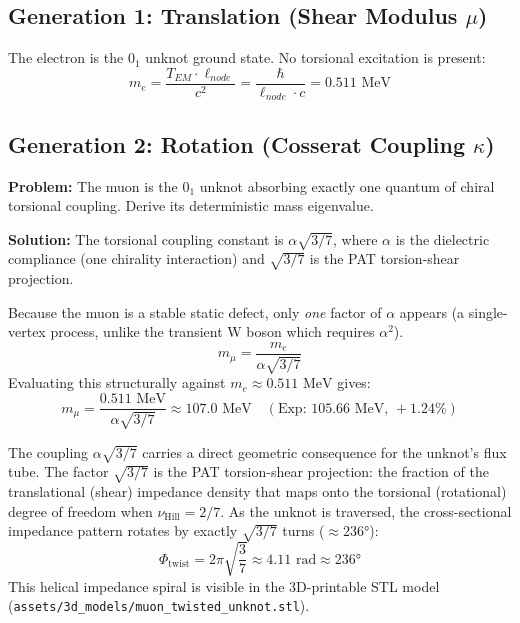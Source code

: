 \subsection{Generation 1: Translation (Shear Modulus $\mu$)}

The electron is the $0_1$ unknot ground state. No torsional excitation is present:
\begin{equation}
    m_e = \frac{T_{EM} \cdot \ell_{node}}{c^2} = \frac{\hbar}{\ell_{node} \cdot c} = 0.511 \text{ MeV}
\end{equation}

\subsection{Generation 2: Rotation (Cosserat Coupling $\kappa$)}

\begin{examplebox}
\textbf{Problem:} The muon is the $0_1$ unknot absorbing exactly one quantum of chiral torsional coupling. Derive its deterministic mass eigenvalue.

\textbf{Solution:} The torsional coupling constant is $\alpha\sqrt{3/7}$, where $\alpha$ is the dielectric compliance (one chirality interaction) and $\sqrt{3/7}$ is the PAT torsion-shear projection. %

Because the muon is a stable static defect, only \textit{one} factor of $\alpha$ appears (a single-vertex process, unlike the transient W boson which requires $\alpha^2$).
\[ m_\mu = \frac{m_e}{\alpha \sqrt{3/7}} \]
Evaluating this structurally against $m_e \approx 0.511 \text{ MeV}$ gives:
\[ m_\mu = \frac{0.511 \text{ MeV}}{\alpha \sqrt{3/7}} \approx 107.0 \text{ MeV} \quad (\text{Exp: } 105.66 \text{ MeV, } +1.24\%) \]
\end{examplebox}

The coupling $\alpha\sqrt{3/7}$ carries a direct geometric consequence for the unknot's flux tube. The factor $\sqrt{3/7}$ is the PAT torsion-shear projection: the fraction of the translational (shear) impedance density that maps onto the torsional (rotational) degree of freedom when $\nu_{\text{Hill}} = 2/7$. As the unknot is traversed, the cross-sectional impedance pattern rotates by exactly $\sqrt{3/7}$ turns ($\approx 236°$): %
\begin{equation}
    \Phi_{\text{twist}} = 2\pi\sqrt{\frac{3}{7}} \approx 4.11 \text{ rad} \approx 236°
    \label{eq:muon_twist_angle}
\end{equation}
This helical impedance spiral is visible in the 3D-printable STL model (\texttt{assets/\allowbreak 3d\_models/\allowbreak muon\_\allowbreak twisted\_\allowbreak unknot.stl}).


